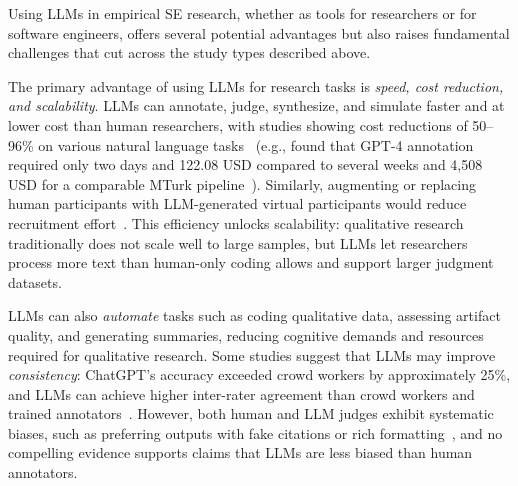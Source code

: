 Using LLMs in empirical SE research, whether as tools for researchers or for software engineers, offers several potential advantages but also raises fundamental challenges that cut across the study types described above.


The primary advantage of using LLMs for research tasks is \emph{speed, cost reduction, and scalability}. LLMs can annotate, judge, synthesize, and simulate faster and at lower cost than human researchers, with studies showing cost reductions of 50--96\% on various natural language tasks~\cite{DBLP:conf/emnlp/WangLXZZ21} (e.g., \citeauthor{DBLP:conf/chi/HeHDRH24} found that GPT-4 annotation required only two days and 122.08 USD compared to several weeks and 4,508 USD for a comparable MTurk pipeline~\cite{DBLP:conf/chi/HeHDRH24}). Similarly, augmenting or replacing human participants with LLM-generated virtual participants would reduce recruitment effort~\cite{DBLP:conf/vl/Madampe0HO24}. This efficiency unlocks scalability: qualitative research traditionally does not scale well to large samples, but LLMs let researchers process more text than human-only coding allows and support larger judgment datasets.

LLMs can also \emph{automate} tasks such as coding qualitative data, assessing artifact quality, and generating summaries, reducing cognitive demands and resources required for qualitative research. Some studies suggest that LLMs may improve \emph{consistency}: ChatGPT's accuracy exceeded crowd workers by approximately 25\%, and LLMs can achieve higher inter-rater agreement than crowd workers and trained annotators~\cite{DBLP:journals/corr/abs-2303-15056}. However, both human and LLM judges exhibit systematic biases, such as preferring outputs with fake citations or rich formatting~\cite{DBLP:conf/emnlp/ChenCLJW24}, and no compelling evidence supports claims that LLMs are less biased than human annotators.

